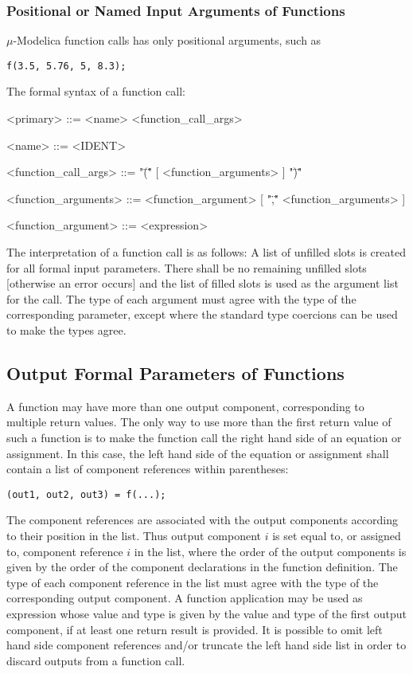 \documentclass[11pt,a4paper,notitlepage]{report}
\begin{document}
\subsubsection{Positional or Named Input Arguments of Functions}

$\mu$-Modelica function calls has only positional arguments, such as

\verb"f(3.5, 5.76, 5, 8.3);"

The formal syntax of a function call:

\begin{grammar}

<primary> ::=
<name> <function_call_args>

<name> ::=
<IDENT> 

<function_call_args> ::=
"\"(\"" [ <function_arguments> ] "\")\""

<function_arguments> ::=
<function_argument> [ "\",\"" <function_arguments> ]

<function_argument> ::=
<expression>

\end{grammar}

The interpretation of a function call is as follows: A list of unfilled slots is created for all formal input parameters. There shall be no remaining unfilled slots [otherwise an error occurs] and the list of filled slots is used as the argument list for the call. The type of each argument must agree with the type of the corresponding parameter, except where the standard type coercions can be used to make the types agree.

\subsection{Output Formal Parameters of Functions}

A function may have more than one output component, corresponding to multiple return values. The only way to use more than the first return value of such a function is to make the function call the right hand side of an equation or assignment. In this case, the left hand side of the equation or assignment shall contain a list of component references within parentheses:

\verb"(out1, out2, out3) = f(...);"

The component references are associated with the output components according to their position in the list. Thus output component $i$ is set equal to, or assigned to, component reference $i$ in the list, where the order of the output components is given by the order of the component declarations in the function definition. The type of each component reference in the list must agree with the type of the corresponding output component.
A function application may be used as expression whose value and type is given by the value and type of the first output component, if at least one return result is provided.
It is possible to omit left hand side component references and/or truncate the left hand side list in order to discard outputs from a function call.
\end{document}
